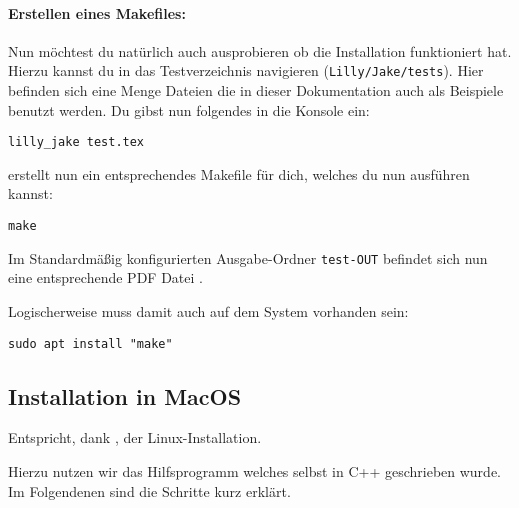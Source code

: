 \paragraph{Erstellen eines Makefiles:}
Nun möchtest du natürlich auch ausprobieren ob die Installation funktioniert hat.
Hierzu kannst du in das Testverzeichnis navigieren (\verb|Lilly/Jake/tests|).
Hier befinden sich eine Menge Dateien die in dieser Dokumentation auch als Beispiele benutzt werden.
Du gibst nun folgendes in die Konsole ein:
\begin{lstlisting}[language=lBash]
lilly_jake test.tex
\end{lstlisting}
\Jake erstellt nun ein entsprechendes Makefile für dich, welches du nun ausführen kannst:
\begin{lstlisting}[language=lBash]
make
\end{lstlisting}
Im Standardmäßig konfigurierten Ausgabe-Ordner \verb|test-OUT| befindet sich nun eine entsprechende PDF
Datei \Smiley.\smallskip
\begin{bemerkung}[make]
    Logischerweise muss damit auch  auf dem System vorhanden sein:
\begin{lstlisting}[language=lBash]
sudo apt install "make"
\end{lstlisting}
\end{bemerkung}

\subsection{Installation in MacOS}
\begin{center}
    Entspricht, dank \Jake, der Linux-Installation.
\end{center}
Hierzu nutzen wir das Hilfsprogramm \Jake welches selbst in C++ geschrieben wurde.
Im Folgendenen sind die Schritte kurz erklärt.
